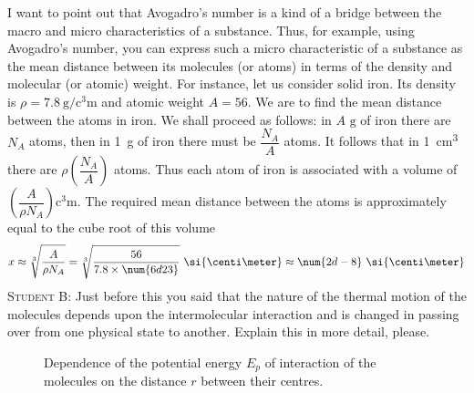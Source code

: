 \documentclass[a4paper,sfsidenotes]{tufte-book}
\begin{document}
I want to point out that Avogadro's number is a kind of a bridge between the macro and micro characteristics of a substance. Thus, for example, using Avogadro's number, you can express such a micro characteristic of a substance as the mean distance between its molecules (or atoms) in terms of the density and molecular (or atomic) weight. For instance, let us consider solid iron. Its density is 
$\rho=\SI{7.8}{\gram\per\cubic\centi\metre}$ and atomic weight $A =56$. We are to find the mean distance between the atoms in iron. We shall proceed as follows: in $A\,\, \si{\gram}$ of iron there are $N_A$ atoms, then in \SI{1}{\gram} of iron there must be $\dfrac{N_{A}}{A}$ atoms. It follows that in \SI{1}{\cubic\centi\meter} there are $\rho \left( \dfrac{N_{A}}{A} \right)$ atoms. Thus each atom of iron is associated with a volume of  $\left( \dfrac{A}{\rho N_{A}} \right) \si{\cubic\centi\meter}$. The required mean distance between the atoms is approximately equal to the cube root of this volume\\
\begin{equation*}
x \approx \sqrt[3]{\frac{A}{\rho N_{A}}} =\sqrt[3]{\frac{56}{7.8\times \num{6d23}}} \,\, \si{\centi\meter} \approx \num{2d-8}\,\, \si{\centi\meter}
\end{equation*}
\textsc{Student B:} Just before this you said that the nature of the thermal motion of the molecules depends upon the intermolecular interaction and is changed in passing over from one physical state to another. Explain this in more detail, please.


\begin{figure}
\centering
\caption{Dependence of the potential energy $E_{p}$ of interaction of the molecules on the distance $r$ between their centres.}
\label{fig-69}
\end{figure}
\end{document}
